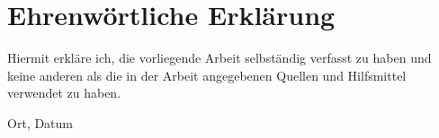 \chapter*{Ehrenwörtliche Erklärung}

Hiermit erkläre ich, die vorliegende Arbeit selbständig verfasst zu haben und keine anderen als die
in der Arbeit angegebenen Quellen und Hilfsmittel verwendet zu haben.


\vspace{2cm}

Ort, Datum \hfill
\authorname


\thispagestyle{empty}
